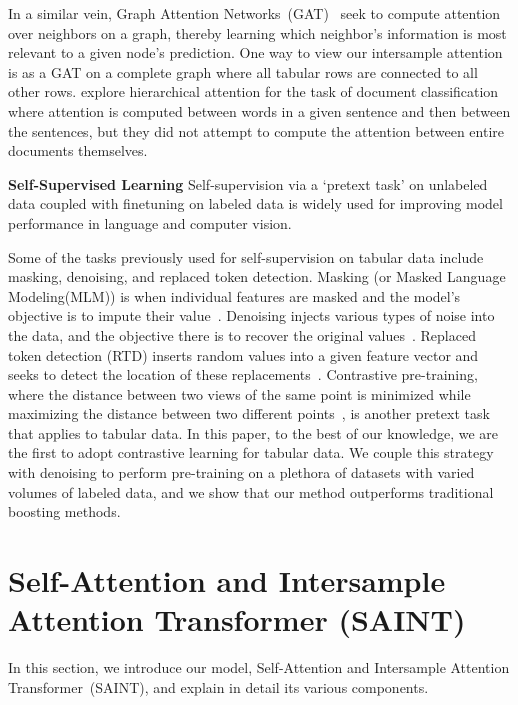 In a similar vein, Graph Attention Networks~(GAT)~\cite{velivckovic2017graph} seek to compute attention over neighbors on a graph, thereby learning which neighbor's information is most relevant to a given node’s prediction. One way to view our intersample attention is as a GAT on a complete graph where all tabular rows are connected to all other rows. \citet{yang2016hierarchical} explore hierarchical attention for the task of document classification where attention is computed between words in a given sentence and then between the sentences, but they did not attempt to compute the attention between entire documents themselves.

\textbf{Self-Supervised Learning} Self-supervision via a `pretext task' on unlabeled data coupled with finetuning on labeled data is widely used for improving model performance in language and computer vision.  

Some of the tasks previously used for self-supervision on tabular data include masking, denoising, and replaced token detection. Masking (or Masked Language Modeling(MLM)) is when individual features are masked and the model's objective is to impute their value~\cite{pathak2016context,arik2019TabNet,huang2020tabtransformer}. Denoising injects various types of noise into the data, and the objective there is to recover the original values~\cite{vincent2008extracting,yoon2020vime}. Replaced token detection (RTD) inserts random values into a given feature vector and seeks to detect the location of these replacements~\cite{huang2020tabtransformer,iida2021tabbie}. Contrastive pre-training, where the distance between two views of the same point is minimized while maximizing the distance between two different points~\cite{chen2020simple,he2020momentum,grill2020bootstrap}, is another pretext task that applies to tabular data.  In this paper, to the best of our knowledge, we are the first to adopt contrastive learning for tabular data.  We couple this strategy with denoising to perform pre-training on a plethora of datasets with varied volumes of labeled data, and we show that our method outperforms traditional boosting methods.

\section{Self-Attention and Intersample Attention Transformer (SAINT)}
\label{sec:saint}

In this section, we introduce our model, Self-Attention and Intersample Attention Transformer~(SAINT), and explain in detail its various components.

